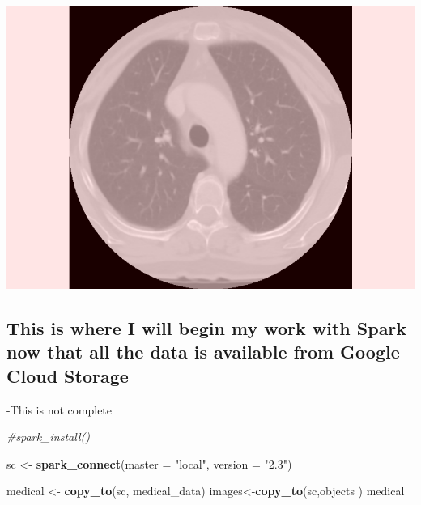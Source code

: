 \documentclass[12pt]{article}
\newenvironment{Shaded}{\begin{snugshade}}{\end{snugshade}}
\newcommand{\CommentTok}[1]{\textcolor[rgb]{0.56,0.35,0.01}{\textit{#1}}}
\newcommand{\DataTypeTok}[1]{\textcolor[rgb]{0.13,0.29,0.53}{#1}}
\newcommand{\KeywordTok}[1]{\textcolor[rgb]{0.13,0.29,0.53}{\textbf{#1}}}
\newcommand{\NormalTok}[1]{#1}
\newcommand{\StringTok}[1]{\textcolor[rgb]{0.31,0.60,0.02}{#1}}
\begin{document}
\includegraphics{report_files/figure-latex/unnamed-chunk-8-1.pdf}

\hypertarget{this-is-where-i-will-begin-my-work-with-spark-now-that-all-the-data-is-available-from-google-cloud-storage}{%
\subsection{This is where I will begin my work with Spark now that all
the data is available from Google Cloud
Storage}\label{this-is-where-i-will-begin-my-work-with-spark-now-that-all-the-data-is-available-from-google-cloud-storage}}

-This is not complete

\begin{Shaded}
\begin{Highlighting}[]
\CommentTok{#spark_install()}

\NormalTok{sc <-}\StringTok{ }\KeywordTok{spark_connect}\NormalTok{(}\DataTypeTok{master =} \StringTok{"local"}\NormalTok{, }\DataTypeTok{version =} \StringTok{"2.3"}\NormalTok{)}


\NormalTok{medical <-}\StringTok{ }\KeywordTok{copy_to}\NormalTok{(sc, medical_data)}
\NormalTok{images<-}\KeywordTok{copy_to}\NormalTok{(sc,objects )}
\NormalTok{medical}
\end{Highlighting}
\end{Shaded}
\end{document}
